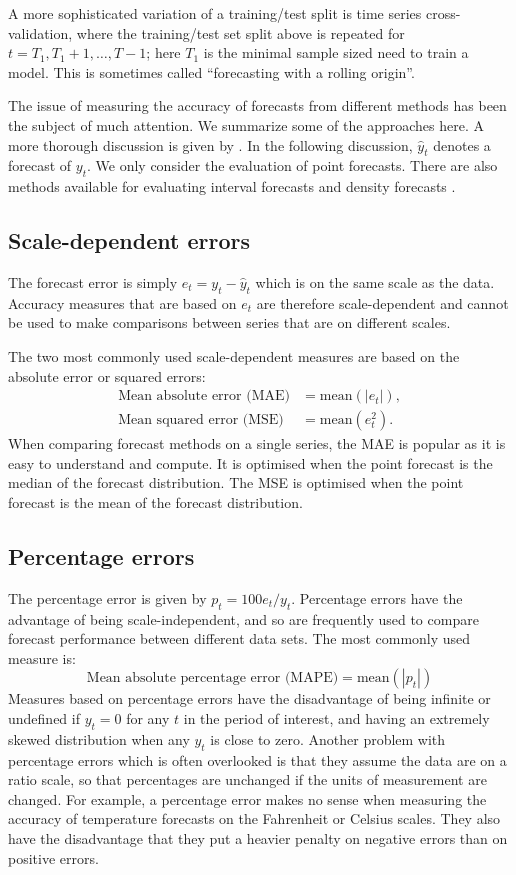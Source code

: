 \documentclass[a4paper,10pt]{article}
\def\mean{\text{mean}}
\begin{document}
A more sophisticated variation of a training/test split is time series cross-validation, where the training/test set split above is repeated for $t = T_1,T_1+1,\dots,T-1$; here $T_1$ is the minimal sample sized need to train a model. This is sometimes called ``forecasting with a rolling origin''.

The issue of measuring the accuracy of forecasts from different methods has been the subject of much attention. We summarize some of the approaches here. A more thorough discussion is given by \citet{HK06}. In the following discussion, $\hat{y}_t$ denotes a forecast of $y_t$. We only consider the evaluation of point forecasts. There are also methods available for evaluating interval forecasts and density forecasts \citep{fpp3}.

\subsection*{Scale-dependent errors}

The forecast error is simply $e_t=y_t-\hat{y}_{t}$ which is on the same scale as the data. Accuracy measures that are based on $e_t$ are therefore scale-dependent and cannot be used to make comparisons between series that are on different scales.

The two most commonly used scale-dependent measures are based on the absolute error or squared errors:
\begin{align*}
  \text{Mean absolute error (MAE)} & = \mean(|e_{t}|),  \\
  \text{Mean squared error (MSE)}  & = \mean(e_{t}^2).
\end{align*}
When comparing forecast methods on a single series, the MAE is popular as it is easy to understand and compute. It is optimised when the point forecast is the median of the forecast distribution. The MSE is optimised when the point forecast is the mean of the forecast distribution.

\subsection*{Percentage errors}

The percentage error is given by $p_t = 100 e_t/y_t$. Percentage errors have the advantage of being scale-independent, and so are frequently used to compare forecast performance between different
data sets. The most commonly used measure is:
\[
  \text{Mean absolute percentage error (MAPE)} = \mean(|p_{t}|)
\]
Measures based on percentage errors have the disadvantage of being infinite or undefined if $y_t=0$ for any $t$ in the period of interest, and having an extremely skewed distribution when any $y_t$ is close to zero. Another problem with percentage errors which is often overlooked is that they assume the data are on a ratio scale, so that percentages are unchanged if the units of measurement are changed. For example, a percentage error makes no sense when measuring the accuracy of temperature forecasts on the Fahrenheit or Celsius scales. They also have the disadvantage that they put a heavier penalty on negative errors than on positive errors.
\end{document}
